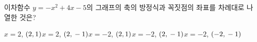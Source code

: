 이차함수 $y=-x^2+4x-5$의 그래프의 축의 방정식과 꼭짓점의 좌표를 차례대로 나열한 것은?
\begin{choicesii}{$x=2$, $(2{,}\mkern3mu 1)$}{$x=2$, $(2{,}\mkern3mu -1)$}{$x=-2$, $(2{,}\mkern3mu 1)$}{$x=-2$, $(2{,}\mkern3mu -1)$}{$x=-2$, $(-2{,}\mkern3mu -1)$}\end{choicesii}
